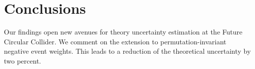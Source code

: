 \section{Conclusions}\label{sec:conclusions}

Our findings open new avenues for theory uncertainty estimation at the
Future Circular Collider. We comment on the extension to
permutation-invariant negative event weights. This leads to a reduction
of the theoretical uncertainty by two percent.

